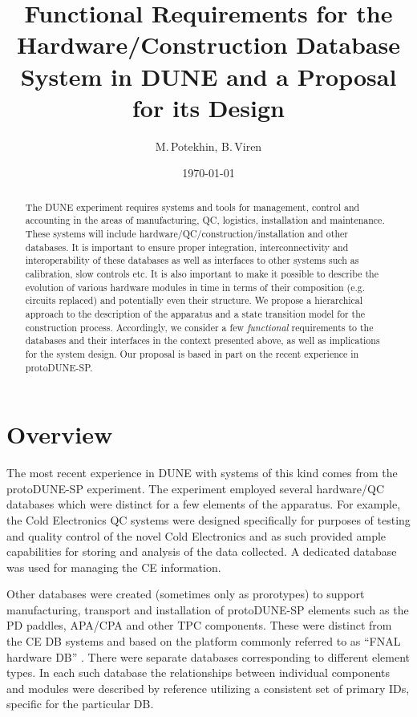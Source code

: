 \documentclass[pdftex,12pt,letter]{article}
\title{Functional Requirements for the Hardware/Construction Database System in DUNE and a Proposal for its Design}
\date{\today}
\author{M.\,Potekhin, B.\,Viren}
\begin{document}
\maketitle

\begin{abstract}
\noindent  The DUNE experiment requires systems and tools for management, control
and accounting  in the areas of manufacturing, QC, logistics, installation and maintenance.
These systems will include hardware/QC/construction/installation and other databases.
It is important to ensure proper integration, interconnectivity and interoperability of these
databases  as well as interfaces to other systems such as calibration, slow controls etc.
It is also important to make it possible to describe the evolution of various hardware modules
in time in terms of their composition (e.g. circuits replaced) and potentially even their structure.
We propose a hierarchical approach to the description of the apparatus and a state transition
model for the construction process. Accordingly, we consider a few \textit{functional}
requirements to the databases and their interfaces  in the context presented above,
as well as implications for the system design.
Our proposal is based in part on the recent experience in protoDUNE-SP.



\end{abstract}


\section{Overview}

The most recent experience in DUNE with systems of this kind comes from the protoDUNE-SP
experiment. The experiment employed several hardware/QC databases which were distinct
for a few elements of the apparatus. For example, the Cold Electronics QC systems were designed specifically
for purposes of testing and quality control of the novel Cold Electronics and as such provided ample capabilities
for storing and analysis of the data collected. A dedicated database was used for managing the CE information.

Other databases were created (sometimes only as prorotypes) to support manufacturing, transport and installation of 
protoDUNE-SP elements such as the PD paddles, APA/CPA and other TPC components. These were distinct from
the CE DB systems and based on the platform commonly referred to as ``FNAL hardware DB'' \cite{hardwareDB}.
There were separate databases corresponding to different element types. In each such database the
relationships between individual components and modules were described by reference utilizing a
consistent set of primary IDs, specific for the particular DB.
\end{document}
